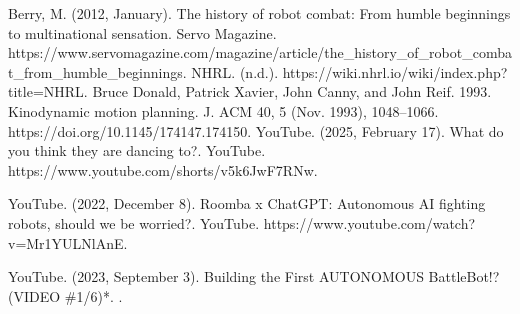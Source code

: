 \documentclass[conference]{IEEEtran}
\begin{document}
\newpage
\begin{thebibliography}{00}
 Berry, M. (2012, January). The history of robot combat: From humble beginnings to multinational sensation. Servo Magazine. https://www.servomagazine.com/magazine/article/the\_history\_of\_robot\_combat\_from\_humble\_beginnings.
 NHRL. (n.d.). https://wiki.nhrl.io/wiki/index.php?title=NHRL.
 Bruce Donald, Patrick Xavier, John Canny, and John Reif. 1993. Kinodynamic motion planning. J. ACM 40, 5 (Nov. 1993), 1048–1066. https://doi.org/10.1145/174147.174150.
 YouTube. (2025, February 17). What do you think they are dancing to?. YouTube. https://www.youtube.com/shorts/v5k6JwF7RNw.


 YouTube. (2022, December 8). Roomba x ChatGPT: Autonomous AI fighting robots, should we be worried?. YouTube. https://www.youtube.com/watch?v=Mr1YULNlAnE.


 YouTube. (2023, September 3). Building the First AUTONOMOUS BattleBot!? (VIDEO \#1/6)*. .





\end{thebibliography}

\vspace{12pt}
\end{document}

